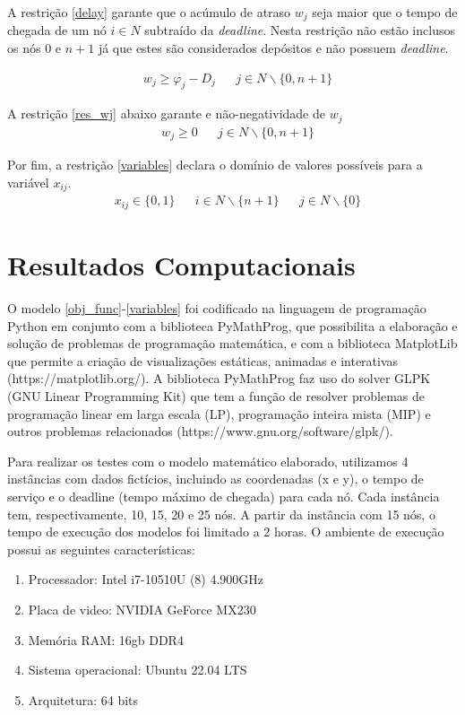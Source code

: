 \documentclass[12pt]{article}
\begin{document}
A restrição \eqref{delay} garante que o acúmulo de atraso $w_j$ seja maior que o tempo de chegada de um nó $i \in N$ subtraído da {\it deadline}. Nesta restrição não estão inclusos os nós $0$ e $n+1$ já que estes são considerados depósitos e não possuem {\it deadline}.

\begin{align}
   & w_j \geq \varphi_j - D_j & \label{delay} & j\in N\backslash \{0,n+1\}
\end{align}

A restrição \eqref{res_wj} abaixo garante e não-negatividade de $w_j$
\begin{align}
   & w_j \geq 0 &  & j\in N\backslash \{0,n+1\} \label{res_wj}
\end{align}

Por fim, a restrição \eqref{variables} declara o domínio de valores possíveis para a variável $x_{ij}$.
\begin{align}
   & x_{ij} \in \{0,1\} &  & i\in N\backslash \{n+1\} &  & j\in N\backslash \{0\}  \label{variables}
\end{align}



\section{Resultados Computacionais}
O modelo \eqref{obj_func}-\eqref{variables} foi codificado na linguagem de programação Python em conjunto com a biblioteca PyMathProg, que possibilita a elaboração e solução de problemas de programação matemática, e com a biblioteca MatplotLib que permite a criação de visualizações estáticas, animadas e interativas (https://matplotlib.org/).
A biblioteca PyMathProg faz uso do solver GLPK (GNU Linear Programming Kit) que tem a função de resolver problemas de programação linear em larga escala (LP), programação inteira mista (MIP) e outros problemas relacionados (https://www.gnu.org/software/glpk/).

Para realizar os testes com o modelo matemático elaborado, utilizamos 4 instâncias com dados fictícios, incluindo as coordenadas (x e y), o tempo de serviço e o deadline (tempo máximo de chegada) para cada nó.
Cada instância tem, respectivamente, 10, 15, 20 e 25 nós. A partir da instância com 15 nós, o tempo de execução dos modelos foi limitado a 2 horas.
O ambiente de execução possui as seguintes características:

\begin{enumerate}[-]
  \item Processador: Intel i7-10510U (8) 4.900GHz
  \item Placa de video: NVIDIA GeForce MX230
  \item Memória RAM: 16gb DDR4
  \item Sistema operacional: Ubuntu 22.04 LTS
  \item Arquitetura: 64 bits
\end{enumerate}
\end{document}
